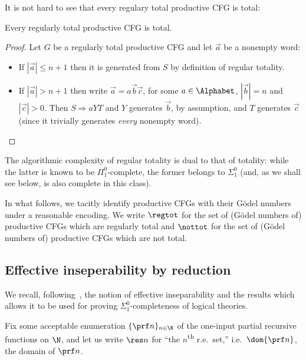 It is not hard to see that
every regulary total productive CFG is total: 

\begin{proposition}
    Every regularly total productive CFG is total.
\end{proposition}
\begin{proof}
    Let $G$ be a regularly total productive CFG and let $\vec a$ be a nonempty word:
    \begin{itemize}
        \item If $|\vec a| \leq n+1$ then it is generated from $S$ by definition of regular totality.
        \item If $|\vec a | > n+1$ then write $\vec a = a\vec b \vec c$, for some $a \in \Alphabet$, $|\vec b| = n$ and $|\vec c| > 0 $. 
        Then $S \Rightarrow a YT$ and $Y$ generates $\vec b$, by assumption, and $T$ generates $\vec c$ (since it trivially generates \emph{every} nonempty word). \qedhere
    \end{itemize}
\end{proof}

The algorithmic complexity of regular totality is dual to that of totality: while the latter is known to be $\Pi^0_1$-complete, the former belongs to $\Sigma^0_1$ (and, as we shall see below, is also complete in this class).

In what follows, we tacitly identify productive CFGs with their G\"odel numbers under a reasonable encoding. 
We write $\regtot$ for the set of (G\"odel numbers of) productive CFGs which are regularly total and $\nottot$ for the set of (G\"odel numbers of) productive CFGs which are not total.


\subsection{Effective inseperability by reduction}

We recall, following~\cite{Kuznetsov2021TOCL}, the notion of effective inseparability and the results which allows it to be used for proving $\Sigma^0_1$-completeness of logical theories. 

Fix some acceptable enumeration $\{ \prf n\}_{n\in \N}$ of the one-input partial recursive functions on $\N$, 
and let us write $\res n$ for ``the $n$\textsuperscript{th} r.e.\ set,'' i.e.\ $\dom { \prf n}$, the domain of $ \prf n$.

